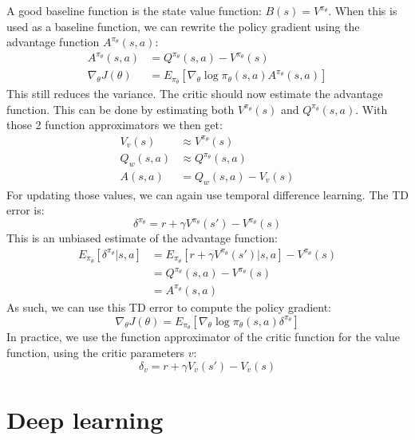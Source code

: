 \documentclass[a4paper, 11pt]{article}
\begin{document}
A good baseline function is the state value function: $B(s) = V^{\pi_{\theta}}$. When this is used as a baseline function, we can rewrite the policy gradient using the advantage function $A^{\pi_{\theta}}(s,a)$:
\begin{align}
A^{\pi_{\theta}}(s,a) &= Q^{\pi_{\theta}}(s,a) - V^{\pi_{\theta}}(s)\\
\nabla_{\theta}J(\theta) &= E_{\pi_{\theta}}[\nabla_{\theta} \log \pi_{\theta}(s,a) A^{\pi_{\theta}}(s,a)]
\end{align}
This still reduces the variance. The critic should now estimate the advantage function. This can be done by estimating both $V^{\pi_{\theta}}(s)$ and $Q^{\pi_{\theta}}(s,a)$. With those 2 function approximators we then get:
\begin{align}
V_v(s) &\approx V^{\pi_{\theta}}(s)\\
Q_w(s,a) &\approx Q^{\pi_{\theta}}(s,a)\\
A(s,a) &= Q_w(s,a) - V_v(s)
\end{align}
For updating those values, we can again use temporal difference learning. The TD error is:
\begin{equation}
\delta^{\pi_{\theta}} = r + \gamma V^{\pi_{\theta}}(s') - V^{\pi_{\theta}}(s)
\end{equation}
This is an unbiased estimate of the advantage function:
\begin{align}
E_{\pi_{\theta}}[\delta^{\pi_{\theta}} | s,a] &= E_{\pi_{\theta}}[r + \gamma V^{\pi_{\theta}}(s') | s,a] - V^{\pi_{\theta}}(s)\\
&= Q^{\pi_{\theta}}(s,a) - V^{\pi_{\theta}}(s)\\
&= A^{\pi_{\theta}}(s,a)
\end{align}
As such, we can use this TD error to compute the policy gradient:
\begin{equation}
\nabla_{\theta}J(\theta) = E_{\pi_{\theta}}[\nabla_{\theta} \log \pi_{\theta}(s,a) \delta^{\pi_{\theta}}]
\end{equation}
In practice, we use the function approximator of the critic function for the value function, using the critic parameters $v$:
\begin{equation}
\delta_v = r + \gamma V_v(s') - V_v(s)
\end{equation}

\section{Deep learning}
\end{document}
